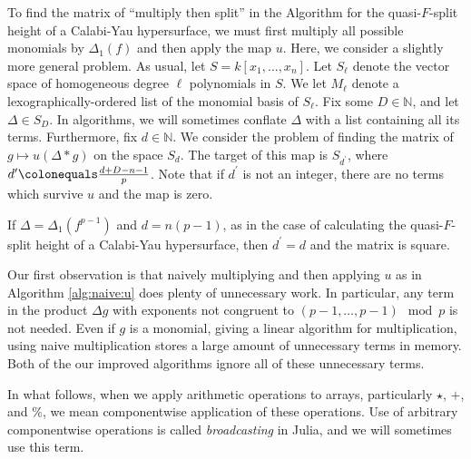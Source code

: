 
To find the matrix of ``multiply then split''
in the Algorithm for the quasi-\(F\)-split height
of a Calabi-Yau hypersurface, 
we must first multiply all possible 
monomials by \(\Delta_{1}(f)\) 
and then apply the map \(u\).
Here, we consider a slightly more general problem.
As usual, let \(S = k[x_{1}, \ldots, x_{n}]\).
Let $S_\ell$ denote the vector space of homogeneous degree $\ell$ polynomials in \(S\).
We let \(M_{\ell}\) denote a lexographically-ordered list
of the monomial basis of \(S_{\ell}\).
Fix some \(D \in \mathbb{N}\), and let \(\Delta \in S_D\).
In algorithms, we will sometimes conflate \(\Delta\) 
with a list containing all its terms.
Furthermore, fix \(d \in \mathbb{N}\).
We consider the problem of finding the matrix of 
\(g \mapsto u(\Delta * g)\)
on the space \(S_{d}\).
The target of this map is
\(S_{d^{\prime}}\), where
\(d^{\prime} \colonequals \frac{d+D-n-1}{p}\).
Note that if \(d^{\prime}\) is not an integer,
there are no terms which survive \(u\) and
the map is zero.

\begin{rmk}
    If \(\Delta = \Delta_{1}(f^{p-1})\) and \(d = n(p-1)\),
	as in the case of calculating the quasi-\(F\)-split
	height of a Calabi-Yau hypersurface, 
	then \(d^{\prime} = d\) and the matrix is 
	square.
\end{rmk}

Our first observation is that naively 
multiplying and then applying \(u\) 
as in Algorithm \ref{alg:naive:u}
does plenty of unnecessary work.
In particular, any term in the 
product \(\Delta g\) with exponents 
not congruent to 
\((p-1, \ldots, p-1) \mod p\)
is not needed. 
Even if \(g\) is a monomial, giving a linear
algorithm for multiplication, using naive
multiplication stores a large amount of unnecessary terms
in memory.
Both of the our improved algorithms ignore
all of these unnecessary terms.

In what follows, 
when we apply arithmetic operations to arrays, 
particularly \(\star\), \(+\), and \(\%\),
we mean componentwise application of these operations.
Use of arbitrary componentwise operations is called
\textit{broadcasting} in Julia, and we will
sometimes use this term.

